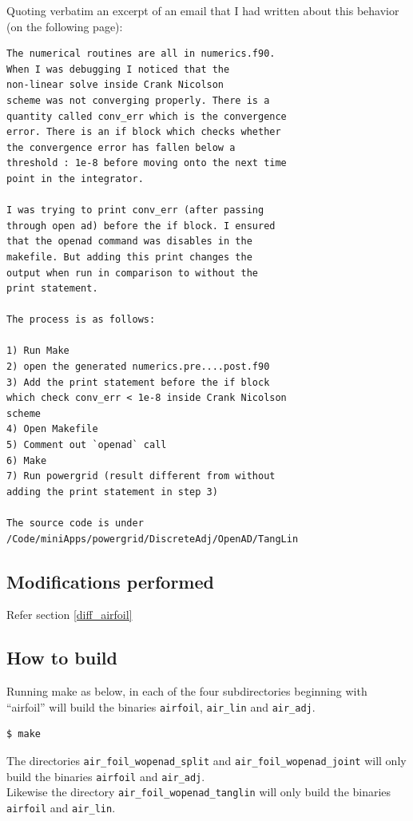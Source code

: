 \noindent Quoting verbatim an excerpt of an email that I had written about this behavior (on the following page):
\clearpage
\begin{Verbatim}[xleftmargin=2em]
The numerical routines are all in numerics.f90. 
When I was debugging I noticed that the 
non-linear solve inside Crank Nicolson 
scheme was not converging properly. There is a 
quantity called conv_err which is the convergence 
error. There is an if block which checks whether
the convergence error has fallen below a 
threshold : 1e-8 before moving onto the next time
point in the integrator. 

I was trying to print conv_err (after passing 
through open ad) before the if block. I ensured
that the openad command was disables in the 
makefile. But adding this print changes the 
output when run in comparison to without the
print statement.

The process is as follows:

1) Run Make
2) open the generated numerics.pre....post.f90
3) Add the print statement before the if block 
which check conv_err < 1e-8 inside Crank Nicolson 
scheme
4) Open Makefile
5) Comment out `openad` call
6) Make
7) Run powergrid (result different from without 
adding the print statement in step 3)

The source code is under 
/Code/miniApps/powergrid/DiscreteAdj/OpenAD/TangLin
\end{Verbatim}
\clearpage
\subsection{Modifications performed}
Refer section \ref{diff_airfoil}
\subsection{How to build}
Running make as below, in each of the four subdirectories beginning with ``airfoil'' will build the  binaries \texttt{airfoil}, \texttt{air\_lin} and \texttt{air\_adj}.
\hfill\break
\begin{lstlisting}[language=mybash, numbers=none]
    $ make
\end{lstlisting}
\begin{NotePar}
\noindent  The directories \texttt{air\_foil\_wopenad\_split} and \texttt{air\_foil\_wopenad\_joint} will only build the binaries \texttt{airfoil} and \texttt{air\_adj}.\\

\noindent Likewise the directory \texttt{air\_foil\_wopenad\_tanglin} will only build the binaries \texttt{airfoil} and \texttt{air\_lin}.
\end{NotePar}
